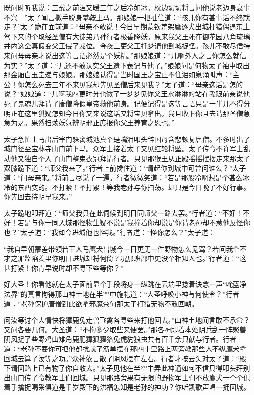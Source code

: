 \documentclass[12pt,UTF8]{ctexbook}
\begin{document}
既问时听我说：三载之前温又暖三年之后冷如冰。枕边切切将言问他说老迈身衰事不兴！”太子闻言撒手脱身攀鞍上马。那娘娘一把扯住道：“孩儿你有甚事话不终就走？”太子跪在面前道：“母亲不敢说！今日早期蒙钦差架鹰逐犬出城打猎偶遇东土驾下来的个取经圣僧有大徒弟乃孙行者极善降妖。原来我父王死在御花园八角琉璃井内这全真假变父王侵了龙位。今夜三更父王托梦请他到城捉怪。孩儿不敢尽信特来问母母亲才说出这等言语必然是个妖精。”那娘娘道：“儿啊外人之言你怎么就信为实？”太子道：“儿还不敢认实父王遗下表记与他了。”娘娘问是何物太子袖中取出那金厢白玉圭递与娘娘。那娘娘认得是当时国王之宝止不住泪如泉涌叫声：“主公！你怎么死去三年不来见我却先见圣僧后来见我？”太子道：“母亲这话是怎的说？”娘娘道：“儿啊我四更时分也做了一梦梦见你父王水淋淋的站在我跟前亲说他死了鬼魂儿拜请了唐僧降假皇帝救他前身。记便记得是这等言语只是一半儿不得分明正在这里狐疑怎知今日你又来说这话又将宝贝拿出。我且收下你且去请那圣僧急急为之。果然扫荡妖氛辨明邪正庶报你父王养育之恩也。”

太子急忙上马出后宰门躲离城池真个是噙泪叩头辞国母含悲顿复唐僧。不多时出了城门径至宝林寺山门前下马。众军士接着太子又见红轮将坠。太子传令不许军士乱动他又独自个入了山门整束衣冠拜请行者。只见那猴王从正殿摇摇摆摆走来那太子双膝跪下道：“师父我来了。”行者上前搀住道：“请起你到城中可曾问谁么？”太子道：“问母亲来。”将前言尽说了一遍。行者微微笑道：“若是那般冷啊想是个甚么冰冷的东西变的。不打紧！不打紧！等我老孙与你扫荡。却只是今日晚了不好行事。你先回去待明早我来。”

太子跪地叩拜道：“师父我只在此伺候到明日同师父一路去罢。”行者道：“不好！不好！若是与你一同入城那怪物生疑不说是我撞着你却说是你请老孙却不惹他反怪你也？”太子道：“我如今进城他也怪我。”行者道：“怪你怎么？”太子道：

“我自早朝蒙差带领若干人马鹰犬出城今一日更无一件野物怎么见驾？若问我个不才之罪监陷羑里你明日进城却将何倚？况那班部中更没个相知人也。”行者道：“这甚打紧！你肯早说时却不寻下些等你？”

好大圣！你看他就在太子面前显个手段将身一纵跳在云端里捻着诀念一声“唵蓝净法界”的真言拘得那山神土地在半空中施礼道：“大圣呼唤小神有何使令？”行者道：“老孙保护唐僧到此欲拿邪魔奈何那太子打猎无物不敢回朝。

问汝等讨个人情快将獐鹿兔走兽飞禽各寻些来打他回去。”山神土地闻言敢不承命？又问各要几何。大圣道：“不拘多少取些来便罢。”那各神即着本处阴兵刮一阵聚兽阴风捉了些野鸡山雉角鹿肥獐狐獾狢兔虎豹狼虫共有百千余只献与行者。行者道：“老孙不要你可把他都捻就了筋单摆在那四十里路上两旁教那些人不纵鹰犬拿回城去算了汝等之功。”众神依言散了阴风摆在左右。行者才按云头对太子道：“殿下请回路上已有物了你自收去。”太子见他在半空中弄此神通如何不信只得叩头拜别出山门传了令教军士们回城。只见那路旁果有无限的野物军士们不放鹰犬一个个俱着手擒捉喝采俱道是千岁殿下的洪福怎知是老孙的神功？你听凯歌声唱一拥回城。
\end{document}
